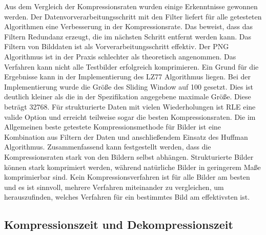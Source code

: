 \documentclass[conference]{IEEEtran}
\begin{document}
Aus dem Vergleich der Kompressionsraten wurden einige Erkenntnisse gewonnen werden.
Der Datenvorverarbeitungsschritt mit den Filter liefert für alle getesteten
Algorithmen eine Verbesserung in der Kompressionsrate.
Das beweist, dass das Filtern Redundanz erzeugt, die im nächsten Schritt
entfernt werden kann.
Das Filtern von Bilddaten ist als Vorverarbeitungsschritt effektiv.
Der PNG Algorithmus ist in der Praxis schlechter als theoretisch angenommen. 
Das Verfahren kann nicht alle Testbilder erfolgreich komprimieren. 
Ein Grund für die Ergebnisse kann in der Implementierung des LZ77 Algorithmus liegen. 
Bei der Implementierung wurde die Größe des Sliding Window auf 100 gesetzt. 
Dies ist deutlich kleiner als die in der Spezifikation angegebene maximale Größe. 
Diese beträgt 32768. \cite{w3c} 
Für strukturierte Daten mit vielen Wiederholungen ist RLE eine valide Option 
und erreicht teilweise sogar die besten Kompressionsraten. 
Die im Allgemeinen beste getestete Kompressionsmethode für Bilder ist eine 
Kombination aus Filtern der Daten und anschließendem Einsatz des Huffman Algorithmus. 
Zusammenfassend kann festgestellt werden, dass die Kompressionsraten stark von den 
Bildern selbst abhängen. 
Strukturierte Bilder können stark komprimiert werden, während natürliche Bilder 
in geringerem Maße komprimierbar sind. 
Kein Kompressionsverfahren ist für alle Bilder am besten und es ist sinnvoll, 
mehrere Verfahren miteinander zu vergleichen, um herauszufinden, welches Verfahren 
für ein bestimmtes Bild am effektivsten ist.



\subsection{Kompressionszeit und Dekompressionszeit}
\end{document}
